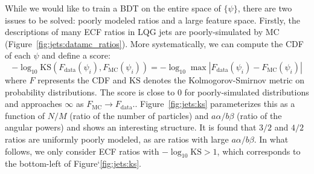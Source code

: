 While we would like to train a BDT on the entire space of $\{\psi\}$, there are two issues to be solved: poorly modeled ratios and a large feature space.
Firstly, the descriptions of many ECF ratios in LQG jets are poorly-simulated by MC (Figure~\ref{fig:jets:datamc_ratios}).
More systematically, we can compute the CDF of each $\psi$ and define a score: 
\begin{equation}
    -\log_{10} \mathrm{KS}(F_\mathrm{data}(\psi_i), F_\mathrm{MC}(\psi_i)) = -\log_{10} \max \left|F_\mathrm{data}(\psi_i) - F_\mathrm{MC}(\psi_i)\right|
\end{equation}
where $F$ represents the CDF and $\mathrm{KS}$ denotes the Kolmogorov-Smirnov metric on probability distributions.
The score is close to 0 for poorly-simulated distributions and approaches $\infty$ as $F_\mathrm{MC} \rightarrow F_\mathrm{data}$..
Figure~\ref{fig:jets:ks} parameterizes this as a function of $N/M$ (ratio of the number of particles) and $a\alpha/b\beta$ (ratio of the angular powers) and shows an interesting structure.
It is found that $3/2$ and $4/2$ ratios are uniformly poorly modeled, as are ratios with large $a\alpha/b\beta$. 
In what follows, we only consider ECF ratios with $-\log_{10}\mathrm{KS} > 1$, which corresponds to the bottom-left of Figure`\ref{fig:jets:ks}. 

